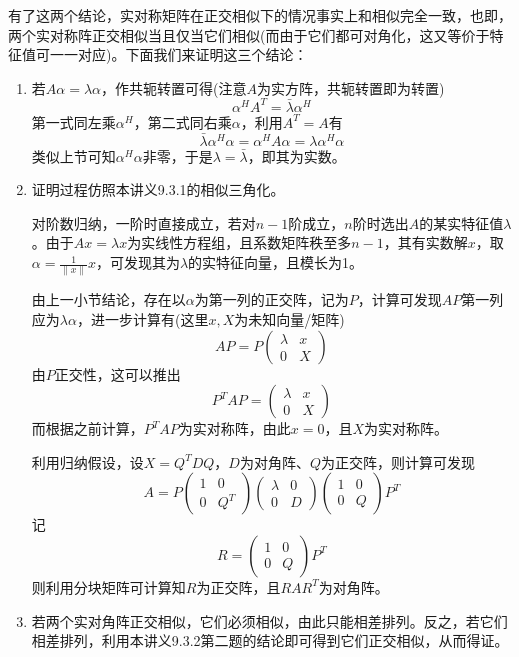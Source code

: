 \documentclass[a4paper,UTF8,fontset=windows]{ctexart}
\begin{document}
有了这两个结论，实对称矩阵在正交相似下的情况事实上和相似完全一致，也即，两个实对称阵正交相似当且仅当它们相似(而由于它们都可对角化，这又等价于特征值可一一对应)。下面我们来证明这三个结论：
\begin{enumerate}
    \item 若$A\alpha=\lambda\alpha$，作共轭转置可得(注意$A$为实方阵，共轭转置即为转置)
    $$\alpha^HA^T=\bar{\lambda}\alpha^H$$
    第一式同左乘$\alpha^H$，第二式同右乘$\alpha$，利用$A^T=A$有
    $$\bar{\lambda}\alpha^H\alpha=\alpha^HA\alpha=\lambda\alpha^H\alpha$$
    类似上节可知$\alpha^H\alpha$非零，于是$\lambda=\bar{\lambda}$，即其为实数。

    \item 证明过程仿照本讲义9.3.1的相似三角化。
    
    对阶数归纳，一阶时直接成立，若对$n-1$阶成立，$n$阶时选出$A$的某实特征值$\lambda$。由于$Ax=\lambda x$为实线性方程组，且系数矩阵秩至多$n-1$，其有实数解$x$，取$\alpha=\frac{1}{\|x\|}x$，可发现其为$\lambda$的实特征向量，且模长为1。
    
    由上一小节结论，存在以$\alpha$为第一列的正交阵，记为$P$，计算可发现$AP$第一列应为$\lambda\alpha$，进一步计算有(这里$x,X$为未知向量/矩阵)
    $$AP=P\begin{pmatrix}\lambda&x\\0&X\end{pmatrix}$$
    由$P$正交性，这可以推出
    $$P^TAP=\begin{pmatrix}\lambda&x\\0&X\end{pmatrix}$$
    而根据之前计算，$P^TAP$为实对称阵，由此$x=0$，且$X$为实对称阵。

    利用归纳假设，设$X=Q^TDQ$，$D$为对角阵、$Q$为正交阵，则计算可发现
    $$A=P\begin{pmatrix}1&0\\0&Q^T\end{pmatrix}\begin{pmatrix}\lambda&0\\0&D\end{pmatrix}\begin{pmatrix}1&0\\0&Q\end{pmatrix}P^T$$
    记
    $$R=\begin{pmatrix}1&0\\0&Q\end{pmatrix}P^T$$
    则利用分块矩阵可计算知$R$为正交阵，且$RAR^T$为对角阵。

    \item 若两个实对角阵正交相似，它们必须相似，由此只能相差排列。反之，若它们相差排列，利用本讲义9.3.2第二题的结论即可得到它们正交相似，从而得证。
\end{enumerate}
\end{document}
